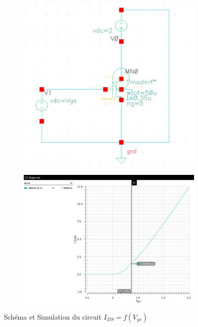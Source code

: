 \documentclass[a4paper]{article}
\begin{document}
\begin{figure}[!htb]
  \begin{subfigure}[t]{.4\linewidth}
      \centering
      \includegraphics[width=\linewidth]{Q1-schematic.png}
      \label{fig:dctransistor}
  \end{subfigure}%
  \begin{subfigure}[t]{.6\linewidth}
    \centering
    \includegraphics[width=\linewidth]{Q1-IDS_VGS.png}
    \label{fig:dctransistor-sim}
  \end{subfigure}%
  \caption{Sch\'ema et Simulation du circuit $I_{DS} = f(V_{gs})$}
  \label{fig:DCtransistor-simulation}
\end{figure}
\end{document}
